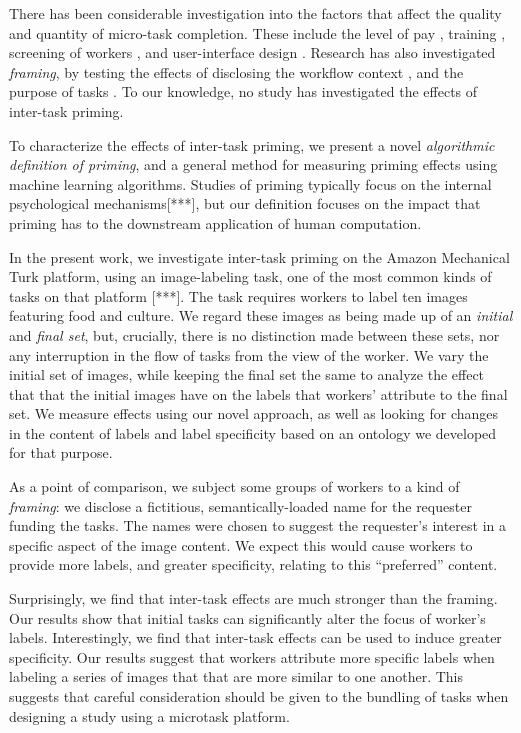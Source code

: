 \documentclass[letterpaper]{article}
\begin{document}
There has been considerable investigation into the factors that affect the 
quality and quantity of micro-task completion.  These include the level of 
pay \cite{kazai2013analysis}, training \cite{le2010ensuring}, screening of 
workers \cite{paolacci2010running}, and user-interface design 
\cite{Finnerty2013}.  Research has also investigated \textit{framing}, 
by testing the effects of disclosing the workflow context 
\cite{Kinnaird2012281}, and the purpose of tasks 
\cite{chandler2013breaking}.  To our knowledge, no study has investigated the 
effects of inter-task priming.

To characterize the effects of inter-task priming, we present a novel  
\textit{algorithmic definition of priming}, and a general method 
for measuring priming effects using machine learning algorithms.  
Studies of priming typically focus on the internal psychological 
mechanisms[***], but our definition focuses on the impact that priming has to
the downstream application of human computation.

In the present work, we investigate inter-task priming on the Amazon 
Mechanical Turk platform, using an image-labeling task, one of the most common 
kinds of tasks on that platform [***].  The task requires workers to label ten 
images featuring 
food and culture.  We regard these images as being made up of an 
\textit{initial} and \textit{final set}, but, crucially, there is no
distinction made between these sets, nor any interruption in the flow of tasks 
from the view of the worker.
We vary the initial set of images, while keeping the final set the same to 
analyze the effect that that the initial images have on the labels that 
workers' attribute to the final set.  We measure effects using our novel 
approach, as well as looking for changes in the content of labels and label 
specificity based on an ontology we developed for that purpose.

As a point of comparison, we subject some groups of workers to a kind of
\textit{framing}: we disclose a fictitious, semantically-loaded name for 
the requester funding the tasks.
The names were chosen to suggest the requester's interest in a specific 
aspect of the image content.  We expect this would cause workers 
to provide more labels, and greater specificity, relating to this 
``preferred'' content.

Surprisingly, we find that inter-task effects are much stronger than the 
framing.  Our results show that initial tasks can significantly alter the 
focus of worker's labels.  Interestingly, we find that inter-task
effects can be used to induce greater specificity.  Our results suggest that
workers attribute more specific labels when labeling a series of images that
that are more similar to one another.  This suggests that careful 
consideration should be given to the bundling of tasks when designing a study 
using a microtask platform.
\end{document}
